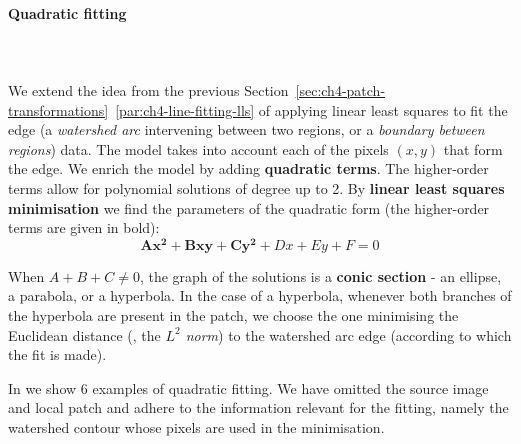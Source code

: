 \paragraph{Quadratic fitting}\mbox{}\\\mbox{}\\
\label{par:ch4-quadratic-lls-fitting}
We extend the idea from the previous Section~\ref*{sec:ch4-patch-transformations}~\ref{par:ch4-line-fitting-lls} of applying linear least squares to fit the edge (a {\it watershed arc} intervening between two regions, or a {\it boundary between regions}) data. The model takes into account each of the pixels $(x,y)$ that form the edge. We enrich %
the model by adding {\bf quadratic terms}. The higher-order terms allow for polynomial solutions of degree up to 2. By {\bf linear least squares minimisation} we find the parameters of the quadratic form (the higher-order terms are given in bold): %
\begin{equation}
 \mathbf{Ax^2+Bxy+Cy^2}+Dx+Ey+F=0
\end{equation}

When $A + B + C \ne 0$, the graph of the solutions is a \textbf{conic section} - an ellipse, a parabola, or a hyperbola. In the case of a hyperbola, whenever both branches of the hyperbola are present in the patch, we choose the one minimising the Euclidean distance (\ie, the {\it $L^2$ norm}) to the watershed arc edge (according to which the fit is made).

In  we show 6 examples of quadratic fitting. We have omitted the source image %
and local patch and adhere to %
the information relevant for the fitting, namely the watershed contour whose pixels are used in the minimisation.


